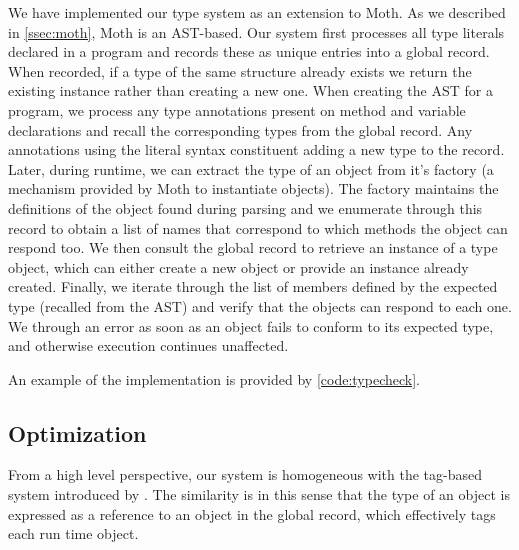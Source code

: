 We have implemented our type system as an extension to Moth.
As we described in \cref{ssec:moth},
Moth is an AST-based.
Our system first processes all type literals declared in a program and records these as
unique entries into a global record.
When recorded, if a type of the same structure already exists we return the existing instance
rather than creating a new one.
When creating the AST for a program, 
we process any type annotations present on method and variable declarations and
recall the corresponding types from the global record. 
Any annotations using the literal syntax constituent adding a new type to the record.
Later, during runtime, we can extract the type of an object from it's factory 
(a mechanism provided by Moth to instantiate objects).
The factory maintains the definitions of the object found during parsing and
we enumerate through this record to obtain a list of names that correspond
to which methods the object can respond too.
We then consult the global record to retrieve an instance of a type object,
which can either create a new object or provide an instance already created.
Finally, we iterate through the list of members defined by the expected type 
(recalled from the AST) and verify that the objects can respond to each one.
We through an error as soon as an object fails to conform to its expected type, 
and otherwise execution continues unaffected. 

An example of the implementation is provided by \cref{code:typecheck}.









\subsection{Optimization}
\label{sec:optimization}

From a high level perspective, 
our system is homogeneous with the tag-based system introduced by \citet{Greenman2017}.
The similarity is in this sense that the type of an object is expressed as a reference
to an object in the global record, which
effectively tags each run time object.

